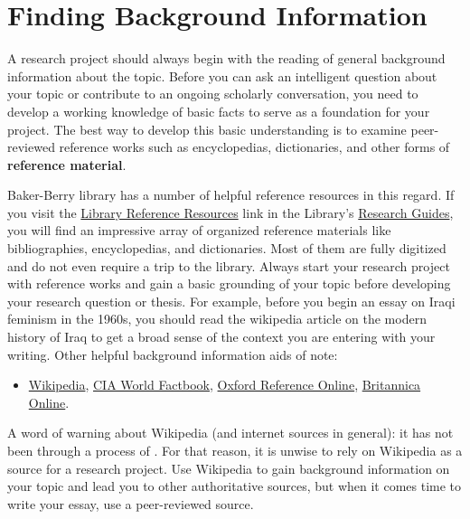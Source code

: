 \section{Finding Background Information}

A research project should always begin with the reading of general background
information about the topic. Before you can ask an intelligent question about
your topic or contribute to an ongoing scholarly conversation, you need to
develop a working knowledge of basic facts to serve as a foundation for your
project. The best way to develop this basic understanding is to examine
peer-reviewed reference works such as encyclopedias, dictionaries, and other
forms of \textbf{reference material}.

Baker-Berry library has a number of helpful reference resources in this regard.
If  you visit the  \href{http://researchguides.dartmouth.edu/reference}{Library Reference Resources} link in the Library's \href{http://researchguides.dartmouth.edu/}{Research Guides}, you
will find an impressive array of organized reference materials like
bibliographies, encyclopedias, and dictionaries. Most of them are fully
digitized and do not even require a trip to the library. Always start your
research project with reference works and gain a basic grounding of your topic
before developing your research question or thesis. For example, before you begin an essay on 
Iraqi feminism in the 1960s, you should read the wikipedia article on the modern history of Iraq to get
a broad sense of the context you are entering with your writing. Other helpful background information aids of note:

\begin{itemize}

\item \href{http://www.wikipedia.org}{Wikipedia}, \href{https://www.cia.gov/library/publications/the-world-factbook/}{CIA World Factbook}, \href{http://www.oxfordreference.com/}{Oxford Reference  Online}, \href{http://www.search.eb.com/}{Britannica Online}.

\end{itemize}

A word of warning about Wikipedia (and internet sources in
general): it has not  been through a process of \hyperlink{peer-review}{\color{Ahrenge}{peer review}}. For that
reason, it is unwise to rely on Wikipedia as a source for a research project. Use
Wikipedia to gain background information on your topic and lead you to other authoritative sources, but when it comes time to write your essay, use a peer-reviewed source.


